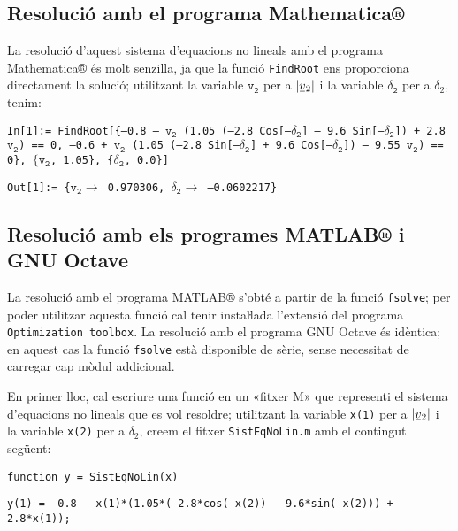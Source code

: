 \subsection{Resolució amb el programa Mathematica®}

La resolució d'aquest sistema d'equacions no lineals amb el programa Mathematica® és molt senzilla, ja que la funció \texttt{FindRoot} ens proporciona directament la solució; utilitzant la variable $\mathtt{v_2}$ per a $|\cmplx{v}_2|$ i la variable $\mathtt{\delta_2}$ per a $\delta_2$, tenim:

\hspace{1cm}\texttt{In[1]:= FindRoot[\{--0.8 -- $\mathtt{v_2}$ (1.05 (--2.8 Cos[--$\mathtt{\delta_2}$] -- 9.6 Sin[--$\mathtt{\delta_2}$]) + 2.8 $\mathtt{v_2}$) == 0,\newline
\phantom{XXXXXXXXXx}--0.6 + $\mathtt{v_2}$ (1.05 (--2.8 Sin[--$\mathtt{\delta_2}$] + 9.6 Cos[--$\mathtt{\delta_2}$]) -- 9.55 $\mathtt{v_2}$) == 0\}, $\{\mathtt{v_2}$, 1.05\},\newline
\phantom{XXXXXXXXx} \{$\mathtt{\delta_2}$, 0.0\}]}

\hspace{1cm}\texttt{Out[1]:= \{$\mathtt{v_2 \rightarrow}$ 0.970306, $\mathtt{\delta_2 \rightarrow}$ --0.0602217\}}

\subsection{Resolució amb els programes MATLAB® i GNU Octave}

La resolució amb el programa MATLAB® s'obté a partir de la funció  \texttt{fsolve}; per  poder utilitzar aquesta funció cal tenir instaŀlada l'extensió del programa \texttt{Optimization toolbox}. La resolució amb el programa GNU Octave és idèntica; en aquest cas la funció \texttt{fsolve} està disponible de sèrie, sense necessitat de carregar cap mòdul addicional.

En primer lloc, cal escriure una funció en un «fitxer M» que representi el sistema d'equacions no lineals que es vol resoldre; utilitzant la variable \texttt{x(1)} per a $|\cmplx{v}_2|$ i la variable \texttt{x(2)} per a $\delta_2$, creem el fitxer \texttt{SistEqNoLin.m} amb el contingut següent:

\hspace{1cm}\texttt{function y = SistEqNoLin(x)}

\hspace{1cm}\texttt{y(1) = --0.8 -- x(1)*(1.05*(--2.8*cos(--x(2)) -- 9.6*sin(--x(2))) + 2.8*x(1));}

